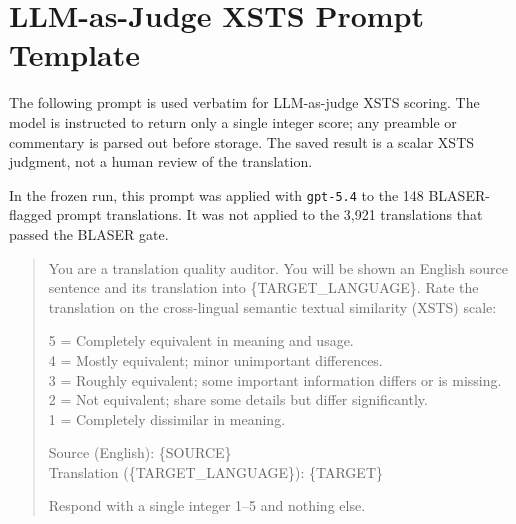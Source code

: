 \chapter{LLM-as-Judge XSTS Prompt Template}
\label{app:xsts-llm-prompt}

The following prompt is used verbatim for LLM-as-judge XSTS scoring. The
model is instructed to return only a single integer score; any preamble or
commentary is parsed out before storage. The saved result is a scalar XSTS
judgment, not a human review of the translation.

In the frozen run, this prompt was applied with \texttt{gpt-5.4} to the 148
BLASER-flagged prompt translations. It was not applied to the 3,921
translations that passed the BLASER gate.

\begin{quote}\small\ttfamily\raggedright
You are a translation quality auditor. You will be shown an English source
sentence and its translation into \{TARGET\_LANGUAGE\}. Rate the translation
on the cross-lingual semantic textual similarity (XSTS) scale:

5 = Completely equivalent in meaning and usage. \\
4 = Mostly equivalent; minor unimportant differences. \\
3 = Roughly equivalent; some important information differs or is missing. \\
2 = Not equivalent; share some details but differ significantly. \\
1 = Completely dissimilar in meaning.

Source (English): \{SOURCE\} \\
Translation (\{TARGET\_LANGUAGE\}): \{TARGET\}

Respond with a single integer 1--5 and nothing else.
\end{quote}
